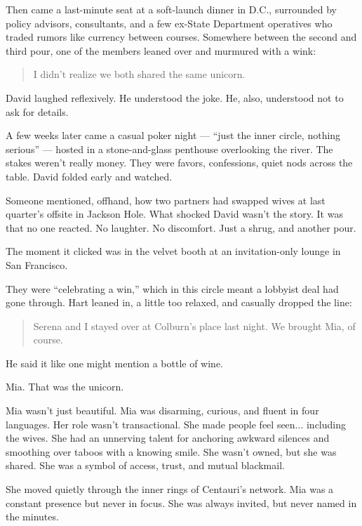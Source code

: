 Then came a last-minute seat at a soft-launch dinner in D.C., surrounded by policy advisors, consultants, and a few ex-State 
Department operatives who traded rumors like currency between courses. Somewhere between the second and third pour, one of the 
members leaned over and murmured with a wink:  

\begin{quote}
  I didn’t realize we both shared the same unicorn.
\end{quote}  

David laughed reflexively. He understood the joke. He, also, understood not to ask for details.

A few weeks later came a casual poker night — ``just the inner circle, nothing serious'' — hosted in a stone-and-glass penthouse 
overlooking the river. The stakes weren’t really money. They were favors, confessions, quiet nods across the table. David 
folded early and watched.

Someone mentioned, offhand, how two partners had swapped wives at last quarter’s offsite in Jackson Hole.  
What shocked David wasn’t the story. It was that no one reacted. No laughter. No discomfort. Just a shrug, and another pour.

The moment it clicked was in the velvet booth at an invitation-only lounge in San Francisco.

They were ``celebrating a win,'' which in this circle meant a lobbyist deal had gone through. Hart leaned in, 
a little too relaxed, and casually dropped the line:

\begin{quote}
  Serena and I stayed over at Colburn’s place last night. We brought Mia, of course.
\end{quote}

He said it like one might mention a bottle of wine. 

Mia. That was the unicorn.  

Mia wasn’t just beautiful. Mia was disarming, curious, and fluent in four languages. Her role wasn’t transactional. 
She made people feel seen... including the wives. She had an unnerving talent for anchoring awkward silences and 
smoothing over taboos with a knowing smile. She wasn’t owned, but she was shared. She was  a symbol of access, trust, 
and mutual blackmail.

She moved quietly through the inner rings of Centauri’s network. Mia was a constant presence but never in focus. She was 
always invited, but never named in the minutes.  

